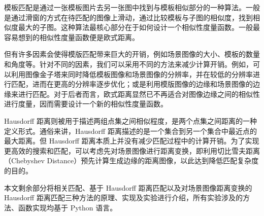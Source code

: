 
模板匹配是通过一张模板图片去另一张图中找到与模板相似部分的一种算法。一般是通过滑窗的方式在待匹配的图像上滑动，通过比较模板与子图的相似度，找到相似度最大的子图。这种算法最核心部分在于如何设计一个相似性度量函数。一般最容易想到的相似性度量函数便是欧式距离。

但有许多因素会使得模版匹配带来巨大的开销，例如场景图像的大小、模板的数量和角度等。针对不同的因素，我们可以采用不同的方法来减少计算开销。例如，可以利用图像金子塔来同时降低模板图像和场景图像的分辨率，并在较低的分辨率进行匹配，进而在更高的分辨率逐步优化；或是利用模版图像的边缘和场景图像的边缘来进行匹配。对于后者而言，欧式距离显然已不再适合对图像边缘之间的相似性进行度量，因而需要设计一个新的相似性度量函数。

Hausdorff 距离则被用于描述两组点集之间相似程度，是两个点集之间距离的一种定义形式。通俗来讲，Hausdorff 距离描述的是一个集合到另一个集合中最近点的最大距离。但 Hausdorff 距离本质上并没有减少匹配过程中的计算开销。为了实现更高效的搜索和匹配，可以考虑先对场景图像进行距离变换，即利用切比雪夫距离（Chebyshev Distance）预先计算生成边缘的距离图像，以此达到降低匹配复杂度的目的。

本文剩余部分将相关匹配、基于 Hausdorff 距离匹配以及对场景图像距离变换的 Hausdorff 距离匹配三种方法的原理、实现及实验进行介绍，所有实验涉及的方法、函数实现均基于 Python 语言。